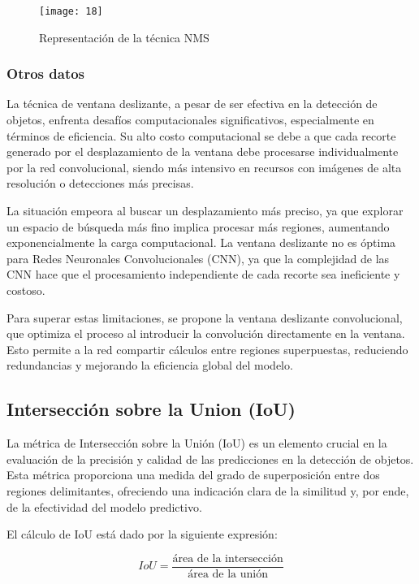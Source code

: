 	\begin{figure}[ht]
	    \centering
		\texttt{[image: 18]}
		\caption{Representación de la técnica NMS}
	\end{figure}
	
	\subsubsection{Otros datos}
	La técnica de ventana deslizante, a pesar de ser efectiva en la detección de objetos, enfrenta desafíos computacionales significativos, especialmente en términos de eficiencia. Su alto costo computacional se debe a que cada recorte generado por el desplazamiento de la ventana debe procesarse individualmente por la red convolucional, siendo más intensivo en recursos con imágenes de alta resolución o detecciones más precisas.

	La situación empeora al buscar un desplazamiento más preciso, ya que explorar un espacio de búsqueda más fino implica procesar más regiones, aumentando exponencialmente la carga computacional. La ventana deslizante no es óptima para Redes Neuronales Convolucionales (CNN), ya que la complejidad de las CNN hace que el procesamiento independiente de cada recorte sea ineficiente y costoso.

	Para superar estas limitaciones, se propone la ventana deslizante convolucional, que optimiza el proceso al introducir la convolución directamente en la ventana. Esto permite a la red compartir cálculos entre regiones superpuestas, reduciendo redundancias y mejorando la eficiencia global del modelo.

	\subsection{Intersección sobre la Union (IoU)}
	La métrica de Intersección sobre la Unión (IoU) es un elemento crucial en la evaluación de la precisión y calidad de las predicciones en la detección de objetos. Esta métrica proporciona una medida del grado de superposición entre dos regiones delimitantes, ofreciendo una indicación clara de la similitud y, por ende, de la efectividad del modelo predictivo.

    
	El cálculo de IoU está dado por la siguiente expresión:
	
	\begin{equation*}
    	IoU = \frac{\text{área de la intersección}}{\text{área de la unión}}
	\end{equation*}
	
